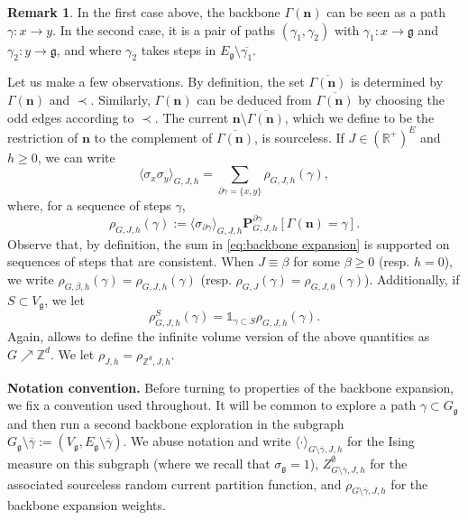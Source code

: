 \documentclass[11pt,a4paper]{article}
\numberwithin{equation}{section}
\theoremstyle{plain}
\theoremstyle{definition}
\newtheorem{Rem}[Thm]{Remark}
\newcommand\n{\mathbf{n}}
\newcommand\fg{\mathfrak{g}}
\begin{document}
\begin{Rem}\label{rem:writing with paths}
In the first case above, the backbone $\Gamma(\n)$ can be seen as a path $\gamma:x\rightarrow y$. In the second case, it is a pair of paths $(\gamma_1,\gamma_2)$ with $\gamma_1:x\rightarrow \fg$ and $\gamma_2:y\rightarrow \fg$, and where $\gamma_2$ takes steps in $E_\fg\setminus \overline{\gamma_1}$.
\end{Rem}	
Let us make a few observations. By definition, the set $\overline{\Gamma(\n)}$ is determined by $\Gamma(\n)$ and $\prec$. Similarly, $\Gamma(\n)$ can be deduced from $\overline{\Gamma(\n)}$ by choosing the odd edges according to $\prec$. The current $\n\setminus\overline{\Gamma(\n)}$, which we define to be the restriction of $\n$ to the complement of $\overline{\Gamma(\n)}$, is sourceless. If $J\in (\mathbb R^+)^E$ and $h\geq 0$, we can write
\begin{equation}\label{eq:backbone expansion}
	\langle \sigma_x\sigma_y\rangle_{G,J,h}=\sum_{\partial \gamma=\{x,y\}}\rho_{G,J,h}(\gamma),
\end{equation}
where, for a sequence of steps $\gamma$,\begin{equation}
	\rho_{G,J,h}(\gamma):=\langle \sigma_{\partial \gamma}\rangle_{G,J,h}\mathbf P^{\partial \gamma}_{G,J,h}[\Gamma(\n)=\gamma].
\end{equation}
Observe that, by definition, the sum in \eqref{eq:backbone expansion} is supported on sequences of steps that are consistent. 
When $J\equiv \beta$ for some $\beta\geq 0$ (resp. $h=0$), we write $\rho_{G,\beta,h}(\gamma)=\rho_{G,J,h}(\gamma)$ (resp. $\rho_{G,J}(\gamma)=\rho_{G,J,0}(\gamma)$). Additionally, if $S\subset V_\fg$, we let 
\begin{equation}\label{eq:def rho S}
\rho_{G,J,h}^S(\gamma)=\mathds{1}_{\gamma\subset S}\rho_{G,J,h}(\gamma).
\end{equation}
 Again, \cite{AizenmanDuminilSidoraviciusContinuityIsing2015} allows to define the infinite volume version of the above quantities as $G\nearrow \mathbb Z^d$. We let $\rho_{J,h}=\rho_{\mathbb Z^d,J,h}$.
 
 \vspace{5pt}
 \noindent \textbf{Notation convention.} Before turning to properties of the backbone expansion, we fix a convention used 
throughout. It will be common to explore a path $\gamma\subset G_\fg$ and then run 
a second backbone exploration in the subgraph $G_\fg\setminus\overline{\gamma} 
:= (V_\fg, E_\fg\setminus\overline{\gamma})$. We abuse notation and write 
$\langle\cdot\rangle_{G\setminus\overline{\gamma},J,h}$ for the Ising measure 
on this subgraph (where we recall that $\sigma_\fg=1$), $Z^\emptyset_{G\setminus\overline{\gamma},J,h}$ for the 
associated sourceless random current partition function, and 
$\rho_{G\setminus\overline{\gamma},J,h}$ for the backbone expansion weights. 
 \vspace{5pt}
\end{document}
